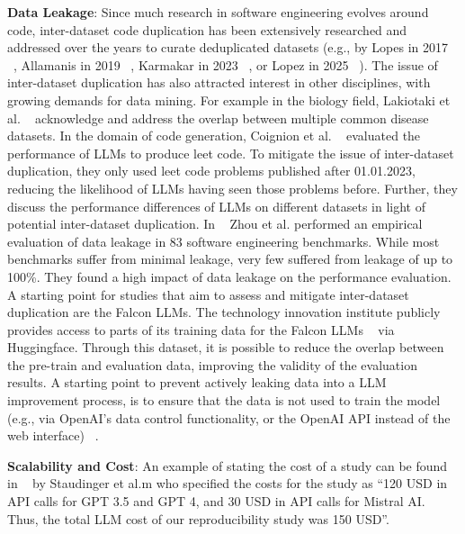\textbf{Data Leakage}:
Since much research in software engineering evolves around code, inter-dataset code duplication has been extensively researched and addressed over the years to curate deduplicated datasets (e.g., by Lopes in 2017 ~\cite{DBLP:journals/pacmpl/LopesMMSYZSV17}, Allamanis in 2019 ~\cite{DBLP:conf/oopsla/Allamanis19}, Karmakar in 2023 ~\cite{DBLP:journals/ese/KarmakarAR23}, or Lopez in 2025 ~\cite{DBLP:journals/tse/LopezCSSV25}).
The issue of inter-dataset duplication has also attracted interest in other disciplines, with growing demands for data mining. For example in the biology field, Lakiotaki et al. ~\cite{DBLP:journals/biodb/LakiotakiVTGT18} acknowledge and address the overlap between multiple common disease datasets. 
In the domain of code generation, Coignion et al. ~\cite{DBLP:conf/ease/CoignionQR24} evaluated the performance of LLMs to produce leet code. To mitigate the issue of inter-dataset duplication, they only used leet code problems published after 01.01.2023, reducing the likelihood of LLMs having seen those problems before. Further, they discuss the performance differences of LLMs on different datasets in light of potential inter-dataset duplication.
In ~\cite{zhou2025lessleakbenchinvestigationdataleakage} Zhou et al. performed an empirical evaluation of data leakage in 83 software engineering benchmarks. While most benchmarks suffer from minimal leakage, very few suffered from leakage of up to 100\%. They found a high impact of data leakage on the performance evaluation.
A starting point for studies that aim to assess and mitigate inter-dataset duplication are the Falcon LLMs. The technology innovation institute publicly provides access to parts of its training data for the Falcon LLMs ~\cite{technology_innovation_institute_2023} via Huggingface. Through this dataset, it is possible to reduce the overlap between the pre-train and evaluation data, improving the validity of the evaluation results.
A starting point to prevent actively leaking data into a LLM improvement process, is to ensure that the data is not used to train the model (e.g., via OpenAI's data control functionality, or the OpenAI API instead of the web interface) ~\cite{DBLP:conf/eacl/BalloccuSLD24}.

\textbf{Scalability and Cost}:
An example of stating the cost of a study can be found in ~\cite{DBLP:conf/sigir-ap/StaudingerKPLH24} by Staudinger et al.m who specified the costs for the study as \enquote{120 USD in API calls for GPT 3.5 and GPT 4, and 30 USD in API calls for Mistral AI. Thus, the total LLM cost of our reproducibility study was 150 USD}.

